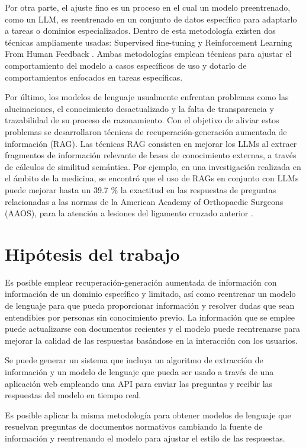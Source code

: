 Por otra parte, el ajuste fino es un proceso en el cual un modelo preentrenado,
como un LLM, es reentrenado en un conjunto de datos específico para adaptarlo a
tareas o dominios especializados. Dentro de esta metodología existen dos técnicas
ampliamente usadas: Supervised fine-tuning y Reinforcement Learning From Human
Feedback \cite{anisuzzaman_fine-tuning_2025}. Ambas metodologías emplean técnicas
para ajustar el comportamiento del modelo a casos específicos de uso y dotarlo de
comportamientos enfocados en tareas específicas.

Por último, los modelos de lenguaje usualmente enfrentan problemas como las
alucinaciones, el conocimiento desactualizado y la falta de transparencia y
trazabilidad de su proceso de razonamiento. Con el objetivo de aliviar estos
problemas se desarrollaron técnicas de recuperación-generación aumentada de
información (RAG). Las técnicas RAG consisten en mejorar los LLMs al extraer
fragmentos de información relevante de bases de conocimiento externas, a través
de cálculos de similitud semántica. Por ejemplo, en una investigación realizada
en el ámbito de la medicina, se encontró que el uso de RAGs en conjunto con LLMs
puede mejorar hasta un 39.7 \% la exactitud en las respuestas de preguntas
relacionadas a las normas de la American Academy of Orthopaedic Surgeons (AAOS),
para la atención a lesiones del ligamento cruzado anterior \cite{woo_custom_2025}.

\section{Hipótesis del trabajo}

Es posible emplear recuperación-generación aumentada de información con información
de un dominio específico y limitado, así como reentrenar un modelo de lenguaje
para que pueda proporcionar información y resolver dudas que sean entendibles
por personas sin conocimiento previo. La información que se emplee puede
actualizarse con documentos recientes y el modelo puede reentrenarse para mejorar
la calidad de las respuestas basándose en la interacción con los usuarios.

Se puede generar un sistema que incluya un algoritmo de extracción de información
y un modelo de lenguaje que pueda ser usado a través de una aplicación web
empleando una API para enviar las preguntas y recibir las respuestas del modelo
en tiempo real.

Es posible aplicar la misma metodología para obtener modelos de lenguaje que
resuelvan preguntas de documentos normativos cambiando la fuente de información
y reentrenando el modelo para ajustar el estilo de las respuestas.
